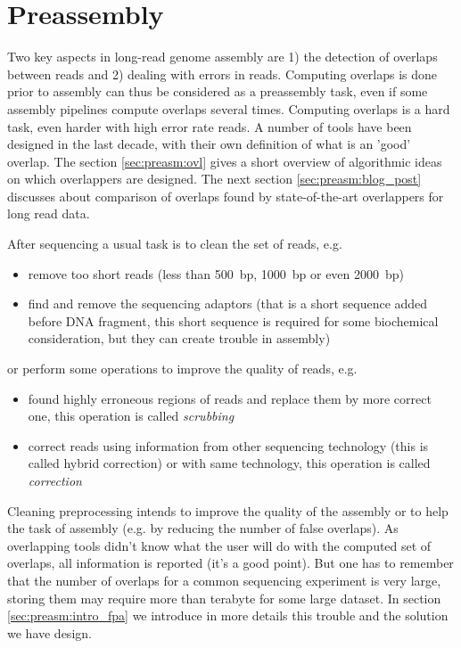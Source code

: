 \documentclass[main.tex]{subfiles}
\begin{document}
\chapter{Preassembly} \label{chapter:preassembly}

Two key aspects in long-read genome assembly are 1) the detection of overlaps between reads and 2) dealing with errors in reads. Computing overlaps is done prior to assembly can thus be considered as a preassembly task, even if some assembly pipelines compute overlaps several times. Computing overlaps is a hard task, even harder with high error rate reads. A number of tools have been designed in the last decade, with their own definition of what is an 'good' overlap. The section \ref{sec:preasm:ovl} gives a short overview of algorithmic ideas on which overlappers are designed. The next section \ref{sec:preasm:blog_post} discusses about comparison of overlaps found by state-of-the-art overlappers for long read data. 

\bigskip

After sequencing a usual task is to clean the set of reads, e.g.
\begin{itemize}
	\item remove too short reads (less than 500~bp, 1000~bp or even 2000~bp)
	\item find and remove the sequencing adaptors (that is a short sequence added before DNA fragment, this short sequence is required for some biochemical consideration, but they can create trouble in assembly)
\end{itemize}
or perform some operations to improve the quality of reads, e.g.
\begin{itemize}
	\item found highly erroneous regions of reads and replace them by more correct one, this operation is called \emph{scrubbing}
	\item correct reads using information from other sequencing technology (this is called hybrid correction) or with same technology, this operation is called \emph{correction} 
\end{itemize}
Cleaning preprocessing intends to improve the quality of the assembly or to help the task of assembly (e.g. by reducing the number of false overlaps). 
As overlapping tools didn't know what the user will do with the computed set of overlaps, all information is reported (it's a good point). But one has to remember that the number of overlaps for a common sequencing experiment is very large, storing them may require more than terabyte for some large dataset. In section \ref{sec:preasm:intro_fpa} we introduce in more details this trouble and the solution we have design. 
\end{document}

